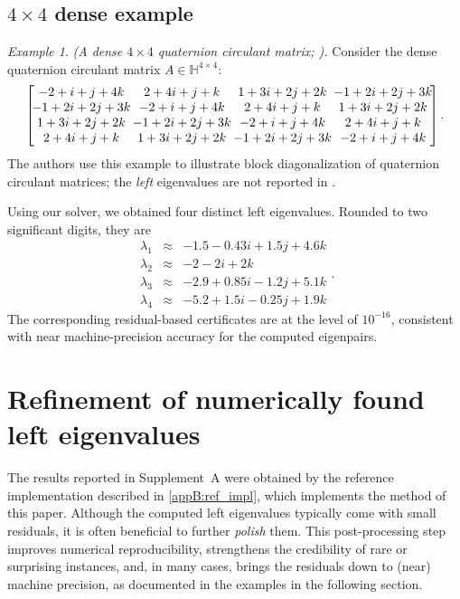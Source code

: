 \documentclass[preprint,12pt]{elsarticle}  %
\theoremstyle{definition}
\theoremstyle{definition}
\theoremstyle{definition}
\theoremstyle{definition}
\theoremstyle{definition}
\theoremstyle{remark}
\theoremstyle{remark}
\newtheorem{Ex}{Example}
\theoremstyle{remark}
\DeclareRobustCommand{\i}{\ensuremath{\mathbf{i}}}
\DeclareRobustCommand{\j}{\ensuremath{\mathbf{j}}}
\DeclareRobustCommand{\k}{\ensuremath{\mathbf{k}}}
\def\i{i}\def\j{j}\def\k{k}%
\newcommand{\HH}{\mathbb{H}}
\begin{document}
\subsection{\texorpdfstring{$4\times4$}{4x4} dense example}
\label{subsec_examples_4x4}
\begin{Ex}\label{ex:PanNg2024_circ4}
\emph{(A dense $4\times4$ quaternion circulant matrix; \cite[Example~1]{PanNg2024}).}
Consider the dense quaternion circulant matrix $A\in\HH^{4\times 4}$:
\[
\renewcommand{\arraystretch}{1.0}
\setlength{\arraycolsep}{0pt}
\left[\!
\begin{array}{@{}c@{\,}c@{\,}c@{\,}c@{}}
 -2 + \i + \j + 4\k & 2 + 4\i + \j + \k & 1 + 3\i + 2\j + 2\k & -1 + 2\i + 2\j + 3\k \\
 -1 + 2\i + 2\j + 3\k & -2 + \i + \j + 4\k & 2 + 4\i + \j + \k & 1 + 3\i + 2\j + 2\k \\
 1 + 3\i + 2\j + 2\k & -1 + 2\i + 2\j + 3\k & -2 + \i + \j + 4\k & 2 + 4\i + \j + \k \\
 2 + 4\i + \j + \k & 1 + 3\i + 2\j + 2\k & -1 + 2\i + 2\j + 3\k & -2 + \i + \j + 4\k
\end{array}
\!\right].
\]
The authors use this example to illustrate block diagonalization of quaternion circulant matrices; the \emph{left} eigenvalues
are not reported in \cite{PanNg2024}.

Using our solver, we obtained four distinct left eigenvalues. Rounded to two significant digits, they are
\[
\begin{array}{rcl}
\lambda_1 & \approx& -1.5 - 0.43\i + 1.5\j + 4.6\k \\
\lambda_2 & \approx& -2 - 2\i + 2\k \\
\lambda_3 & \approx& -2.9 + 0.85\i - 1.2\j + 5.1\k \\
\lambda_4 & \approx& -5.2 + 1.5\i - 0.25\j + 1.9\k
\end{array}.
\]
The corresponding residual-based certificates are at the level of $10^{-16}$, consistent with near machine-precision accuracy for
the computed eigenpairs.
\end{Ex}

\section{Refinement of numerically found left eigenvalues}
\label{sec:refinement}
The results reported in Supplement~A were obtained by the reference implementation described in \ref{appB:ref_impl}, which implements the method of this paper.
Although the computed left eigenvalues typically come with small residuals, it is often beneficial to further \emph{polish} them.
This post-processing step improves numerical reproducibility, strengthens the credibility of rare or surprising instances, and, in many cases, brings the residuals down to (near) machine precision, as documented in the examples in the following section.
\end{document}
